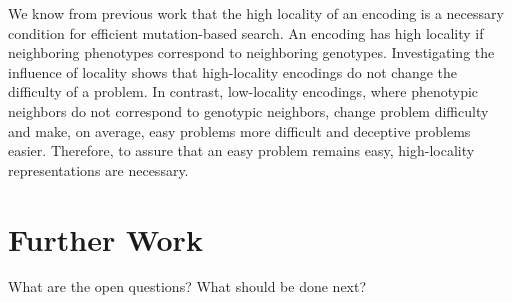We know from previous work that the high locality of an encoding is a necessary condition for efficient mutation-based search.
An encoding has high locality if neighboring phenotypes correspond to neighboring genotypes.
Investigating the  influence of locality shows that  high-locality encodings do not change the difficulty of a problem. In contrast, low-locality encodings, where phenotypic neighbors do not correspond to genotypic neighbors, change problem difficulty and make, on average, easy problems more difficult and deceptive problems easier.
Therefore, to assure that  an easy problem remains easy, high-locality representations  are necessary.

\section{Further Work}

What are the open questions? What should be done next?


